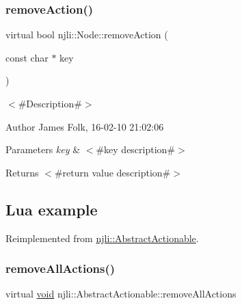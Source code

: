 \subsubsection{\texorpdfstring{remove\+Action()}{removeAction()}\hspace{0.1cm}{\footnotesize\ttfamily [2/2]}}
{\footnotesize\ttfamily virtual bool njli\+::\+Node\+::remove\+Action (\begin{DoxyParamCaption}\item[{const char $\ast$}]{key }\end{DoxyParamCaption})\hspace{0.3cm}{\ttfamily [virtual]}}



$<$\#\+Description\#$>$ 

\begin{DoxyAuthor}{Author}
James Folk, 16-\/02-\/10 21\+:02\+:06
\end{DoxyAuthor}

\begin{DoxyParams}{Parameters}
{\em key} & $<$\#key description\#$>$\\
\hline
\end{DoxyParams}
\begin{DoxyReturn}{Returns}
$<$\#return value description\#$>$
\end{DoxyReturn}
\hypertarget{classnjli_1_1_steering_behavior_wander_ex1}{}\subsection{Lua example}\label{classnjli_1_1_steering_behavior_wander_ex1}

\begin{DoxyCodeInclude}
\end{DoxyCodeInclude}


Reimplemented from \mbox{\hyperlink{classnjli_1_1_abstract_actionable_a902395a20ef04482b15e7a65c0be4bad}{njli\+::\+Abstract\+Actionable}}.

\mbox{\label{classnjli_1_1_node_a758cc11b09194399de63537e0f7e1485}} 
\subsubsection{\texorpdfstring{remove\+All\+Actions()}{removeAllActions()}\hspace{0.1cm}{\footnotesize\ttfamily [1/2]}}
{\footnotesize\ttfamily virtual \mbox{\hyperlink{_thread_8h_af1e856da2e658414cb2456cb6f7ebc66}{void}} njli\+::\+Abstract\+Actionable\+::remove\+All\+Actions}

